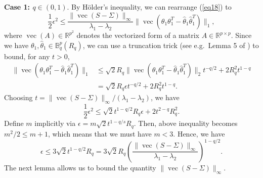\documentclass[11pt]{article}
\newcommand{\R}{\mathbb{R}}
\newcommand{\B}{\mathbb{B}}
\begin{document}
\textbf{Case 1: $q\in (0,1)$}. By H\"{o}lder's inequality, we can rearrange (\ref{eq18}) to 
\begin{equation*}
\frac{1}{2}\epsilon^2 \le \frac{\|\operatorname{vec}(S-\Sigma)\|_\infty}{\lambda_1 - \lambda_2}\|\operatorname{vec}(\theta_1\theta_1^T - \hat\theta_1\hat\theta_1^T)\|_1,
\end{equation*}
where $\operatorname{vec}(A)\in\R^{p^2}$ denotes the vectorized form of a matrix $A\in\R^{p\times p}$. Since we have $\theta_1, \hat\theta_1\in \B^p_q(R_q)$, we can use a truncation trick (see e.g.\ Lemma 5 of \cite{RWY11}) to bound, for any $t>0$,
\begin{align*}
\|\operatorname{vec}(\theta_1\theta_1^T - \hat\theta_1\hat\theta_1^T)\|_1 &\le \sqrt{2} R_q \|\operatorname{vec}(\theta_1\theta_1^T - \hat\theta_1\hat\theta_1^T)\|_2t^{-q/2} + 2 R_q^2t^{1-q} \\
&= \sqrt{2}R_q\epsilon t^{-q/2} + 2R_q^2t^{1-q}.
\end{align*}
Choosing $t = \|\operatorname{vec}(S-\Sigma)\|_\infty/(\lambda_1 - \lambda_2)$, we have
\begin{equation*}
\frac{1}{2}\epsilon^2 \le \sqrt{2}t^{1-q/2}R_q\epsilon + 2t^{2-q}R_q^2.
\end{equation*}
Define $m$ implicitly via $\epsilon = m\sqrt{2}t^{1-q/s}R_q$. Then, above inequality becomes $m^2/2 \le m+1$, which means that we must have $m<3$. Hence, we have
\begin{equation*}
\epsilon \le 3\sqrt{2}t^{1-q/2}R_q = 3\sqrt{2}R_q \left(\frac{\|\operatorname{vec}(S-\Sigma)\|_\infty}{\lambda_1 - \lambda_2}\right)^{1-q/2}.
\end{equation*}
The next lemma allows us to bound the quantity $\|\operatorname{vec}(S-\Sigma)\|_\infty$.
\end{document}
